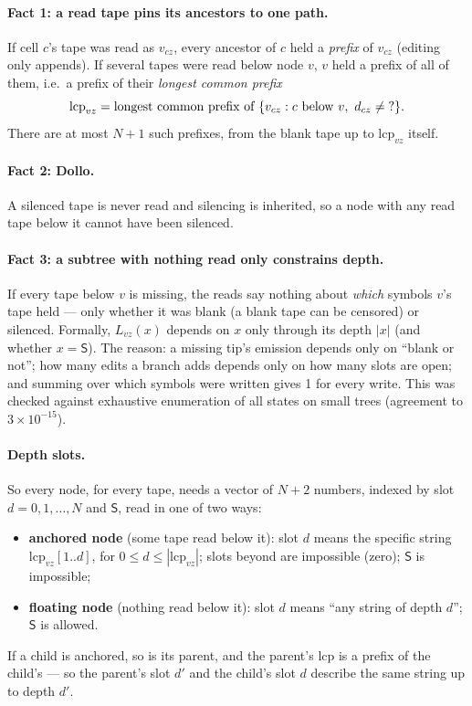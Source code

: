 \documentclass[11pt]{article}
\newcommand{\Sil}{\mathsf{S}}               %
\newcommand{\lcp}{\mathrm{lcp}}
\newcommand{\miss}{\textup{?}}
\begin{document}
\paragraph{Fact 1: a read tape pins its ancestors to one path.} If cell $c$'s tape was read as
$v_{cz}$, every ancestor of $c$ held a \emph{prefix} of $v_{cz}$ (editing only appends). If several
tapes were read below node $v$, $v$ held a prefix of all of them, i.e.\ a prefix of their
\emph{longest common prefix}
\begin{equation}
\lcp_{vz}=\text{longest common prefix of }\{v_{cz}:c\text{ below }v,\ d_{cz}\ne\miss\}.
\end{equation}
There are at most $N+1$ such prefixes, from the blank tape up to $\lcp_{vz}$ itself.

\paragraph{Fact 2: Dollo.} A silenced tape is never read and silencing is inherited, so a node with
any read tape below it cannot have been silenced.

\paragraph{Fact 3: a subtree with nothing read only constrains depth.} If every tape below $v$ is
missing, the reads say nothing about \emph{which} symbols $v$'s tape held --- only whether it was
blank (a blank tape can be censored) or silenced. Formally, $L_{vz}(x)$ depends on $x$ only through
its depth $|x|$ (and whether $x=\Sil$). The reason: a missing tip's emission depends only on
``blank or not''; how many edits a branch adds depends only on how many slots are open; and summing
over which symbols were written gives 1 for every write. This was checked against exhaustive
enumeration of all states on small trees (agreement to $3\times10^{-15}$).

\paragraph{Depth slots.} So every node, for every tape, needs a vector of $N+2$ numbers, indexed by
slot $d=0,1,\dots,N$ and $\Sil$, read in one of two ways:
\begin{itemize}
\item \textbf{anchored node} (some tape read below it): slot $d$ means the specific string
  $\lcp_{vz}[1..d]$, for $0\le d\le|\lcp_{vz}|$; slots beyond are impossible (zero); $\Sil$ is
  impossible;
\item \textbf{floating node} (nothing read below it): slot $d$ means ``any string of depth $d$'';
  $\Sil$ is allowed.
\end{itemize}
If a child is anchored, so is its parent, and the parent's lcp is a prefix of the child's --- so the
parent's slot $d'$ and the child's slot $d$ describe the same string up to depth $d'$.
\end{document}
